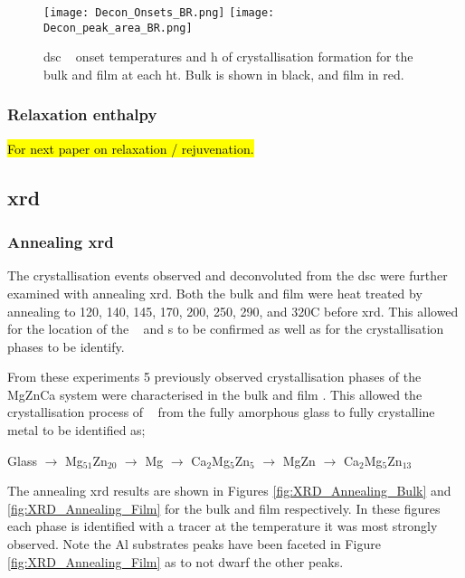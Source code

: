 \documentclass[draft,a4paper,12pt,oneside]{article}%
\begin{document}
\begin{figure}[b]
	\centering
	\texttt{[image: Decon\_Onsets\_BR.png]}
	\medskip
	\texttt{[image: Decon\_peak\_area\_BR.png]}
	\caption{\acrshort{dsc} \Tx~ onset temperatures and \acrfull{h} of crystallisation formation for the bulk and film at each \acrfull{ht}. Bulk is shown in black, and film in red.}
	\label{fig:DSC_Decon}
\end{figure}

\subsubsection{Relaxation enthalpy}

\hl{For next paper on relaxation / rejuvenation.}

\subsection{\acrshort{xrd}}
\subsubsection{Annealing \acrshort{xrd}}

The crystallisation events observed and deconvoluted from the \acrshort{dsc} were further examined with annealing \acrshort{xrd}. Both the bulk and film were heat treated by annealing to 120, 140, 145, 170, 200, 250, 290, and 320\degree C before \acrshort{xrd}. This allowed for the location of the \Tg~ and \Tx s to be confirmed as well as for the crystallisation phases to be identify.

From these experiments 5 previously observed crystallisation phases of the MgZnCa system \cite{Zhang2013, Zhang2012, Zhang2011, Khan1989, Cao2016} were characterised in the bulk and film \MgZnCa. This allowed the crystallisation process of \MgZnCa~ from the fully amorphous glass to fully crystalline metal to be identified as;

\centerline{Glass $\rightarrow$ Mg$_{51}$Zn$_{20}$ $\rightarrow$ Mg $\rightarrow$ Ca$_{2}$Mg$_{5}$Zn$_{5}$ $\rightarrow$ MgZn $\rightarrow$ Ca$_{2}$Mg$_{5}$Zn$_{13}$}

The annealing \acrshort{xrd} results are shown in Figures \ref{fig:XRD_Annealing_Bulk} and \ref{fig:XRD_Annealing_Film} for the bulk and film respectively. In these figures each phase is identified with a tracer at the temperature it was most strongly observed. Note the Al substrates peaks have been faceted in Figure \ref{fig:XRD_Annealing_Film} as to not dwarf the other peaks. 
\end{document}
